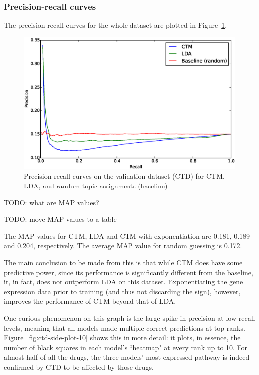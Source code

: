 \documentclass[12pt,a4paper,twoside,openright]{report}
\begin{document}
\subsubsection{Precision-recall curves}

The precision-recall curves for the whole dataset are plotted in Figure~\ref{fig:ctd-pr-curves}.

\begin{figure}[!htb]
\includegraphics[width=\textwidth]{ctd-pr-curves.eps}
\caption{Precision-recall curves on the validation dataset (CTD) for CTM, LDA, and random topic assignments (baseline)}
\label{fig:ctd-pr-curves}
\end{figure}

TODO: what are MAP values?

TODO: move MAP values to a table

The MAP values for CTM, LDA and CTM with exponentiation are 0.181, 0.189 and 0.204, respectively. The average MAP value for random guessing is 0.172.

The main conclusion to be made from this is that while CTM does have some predictive power, since its performance is significantly different from the baseline, it, in fact, does not outperform LDA on this dataset. Exponentiating the gene expression data prior to training (and thus not discarding the sign), however, improves the performance of CTM beyond that of LDA.

One curious phenomenon on this graph is the large spike in precision at low recall levels, meaning that all models made multiple correct predictions at top ranks. Figure~\ref{fig:ctd-side-plot-10} shows this in more detail: it plots, in essence, the number of black squares in each model's ``heatmap" at every rank up to 10. For almost half of all the drugs, the three models' most expressed pathway is indeed confirmed by CTD to be affected by those drugs.
\end{document}
